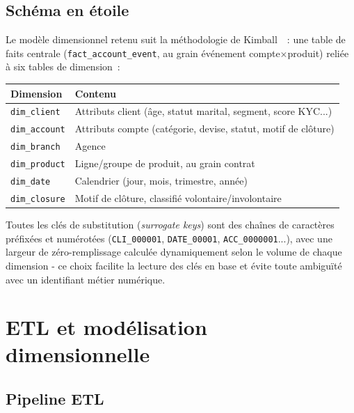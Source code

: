 \documentclass[11pt,a4paper]{report}
\begin{document}
\section{Sch\'ema en \'etoile}

Le mod\`ele dimensionnel retenu suit la m\'ethodologie de
Kimball~\citep{kimball2013}~: une table de faits centrale
(\texttt{fact\_account\_event}, au grain \'ev\'enement compte$\times$produit) reli\'ee
\`a six tables de dimension~:

\begin{center}
\begin{tabular}{ll}
\toprule
\textbf{Dimension} & \textbf{Contenu} \\
\midrule
\texttt{dim\_client}   & Attributs client (\^age, statut marital, segment, score KYC...) \\
\texttt{dim\_account}  & Attributs compte (cat\'egorie, devise, statut, motif de cl\^oture) \\
\texttt{dim\_branch}   & Agence \\
\texttt{dim\_product}  & Ligne/groupe de produit, au grain contrat \\
\texttt{dim\_date}     & Calendrier (jour, mois, trimestre, ann\'ee) \\
\texttt{dim\_closure}  & Motif de cl\^oture, classifi\'e volontaire/involontaire \\
\bottomrule
\end{tabular}
\end{center}

Toutes les cl\'es de substitution (\emph{surrogate keys}) sont des cha\^ines de
caract\`eres pr\'efix\'ees et num\'erot\'ees (\texttt{CLI\_000001},
\texttt{DATE\_00001}, \texttt{ACC\_0000001}...), avec une largeur de
z\'ero-remplissage calcul\'ee dynamiquement selon le volume de chaque dimension
- ce choix facilite la lecture des cl\'es en base et \'evite toute ambigu\"it\'e
avec un identifiant m\'etier num\'erique.

\chapter{ETL et mod\'elisation dimensionnelle}
\label{ch:etl}

\section{Pipeline ETL}
\end{document}
